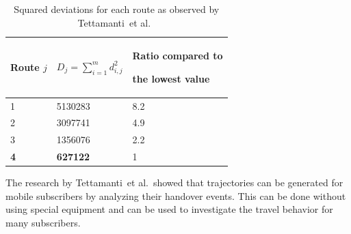 \documentclass[master,english]{hgbthesis}
\begin{document}
\begin{table}[h]











\begin{tabular}{l|ll}

\hline

Route $j$                   &  $D_j=\sum_{i=1}^{m} d_{i,j}^{2}$ & Ratio compared to

the lowest value  \\ \hline

1&5130283&8.2 \\

2&3097741&4.9 \\

3&1356076&2.2 \\

\textbf{4}  &\textbf{627122} &1 \\ \hline

\end{tabular}

\caption{Squared deviations for each route as observed by Tettamanti~et al.\ \cite{Tettamanti2012}}

\label{tab:tetta}

\end{table}

The research by Tettamanti~et al.\ showed that trajectories can be generated for mobile subscribers by analyzing their handover events. This can be done without using special equipment and can be used to investigate the travel behavior for many subscribers.
\end{document}
